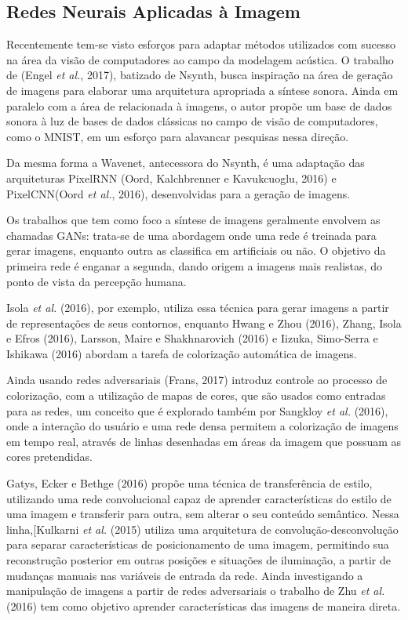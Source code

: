 \documentclass[]{article}
\begin{document}
\hypertarget{redes-neurais-aplicadas-uxe0-imagem}{%
\subsection{Redes Neurais Aplicadas à
Imagem}\label{redes-neurais-aplicadas-uxe0-imagem}}

Recentemente tem-se visto esforços para adaptar métodos utilizados com
sucesso na área da visão de computadores ao campo da modelagem acústica.
O trabalho de (Engel \emph{et al.}, 2017), batizado de Nsynth, busca
inspiração na área de geração de imagens para elaborar uma arquitetura
apropriada a síntese sonora. Ainda em paralelo com a área de relacionada
à imagens, o autor propõe um base de dados sonora à luz de bases de
dados clássicas no campo de visão de computadores, como o MNIST, em um
esforço para alavancar pesquisas nessa direção.

Da mesma forma a Wavenet, antecessora do Nsynth, é uma adaptação das
arquiteturas PixelRNN (Oord, Kalchbrenner e Kavukcuoglu, 2016) e
PixelCNN(Oord \emph{et al.}, 2016), desenvolvidas para a geração de
imagens.

Os trabalhos que tem como foco a síntese de imagens geralmente envolvem
as chamadas GANs: trata-se de uma abordagem onde uma rede é treinada
para gerar imagens, enquanto outra as classifica em artificiais ou não.
O objetivo da primeira rede é enganar a segunda, dando origem a imagens
mais realistas, do ponto de vista da percepção humana.

Isola \emph{et al.} (2016), por exemplo, utiliza essa técnica para gerar
imagens a partir de representações de seus contornos, enquanto Hwang e
Zhou (2016), Zhang, Isola e Efros (2016), Larsson, Maire e Shakhnarovich
(2016) e Iizuka, Simo-Serra e Ishikawa (2016) abordam a tarefa de
colorização automática de imagens.

Ainda usando redes adversariais (Frans, 2017) introduz controle ao
processo de colorização, com a utilização de mapas de cores, que são
usados como entradas para as redes, um conceito que é explorado também
por Sangkloy \emph{et al.} (2016), onde a interação do usuário e uma
rede densa permitem a colorização de imagens em tempo real, através de
linhas desenhadas em áreas da imagem que possuam as cores pretendidas.

Gatys, Ecker e Bethge (2016) propõe uma técnica de transferência de
estilo, utilizando uma rede convolucional capaz de aprender
características do estilo de uma imagem e transferir para outra, sem
alterar o seu conteúdo semântico. Nessa linha,{[}Kulkarni \emph{et al.}
(2015) utiliza uma arquitetura de convolução-desconvolução para separar
características de posicionamento de uma imagem, permitindo sua
reconstrução posterior em outras posições e situações de iluminação, a
partir de mudanças manuais nas variáveis de entrada da rede. Ainda
investigando a manipulação de imagens a partir de redes adversariais o
trabalho de Zhu \emph{et al.} (2016) tem como objetivo aprender
características das imagens de maneira direta.
\end{document}
